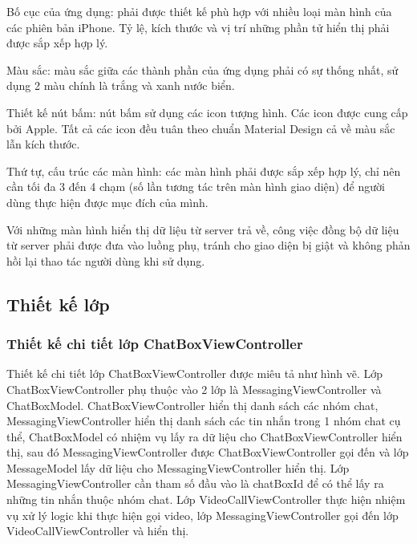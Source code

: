\documentclass[../DoAn.tex]{subfiles}
\begin{document}
Bố cục của ứng dụng: phải được thiết kế phù hợp với nhiều loại màn hình của các phiên bản iPhone. Tỷ lệ, kích thước và vị trí những phần tử hiển thị phải được sắp xếp hợp lý.

Màu sắc: màu sắc giữa các thành phần của ứng dụng phải có sự thống nhất, sử dụng 2 màu chính là trắng và xanh nước biển.

Thiết kế nút bấm: nút bấm sử dụng các icon tượng hình. Các icon được cung cấp bởi Apple. Tất cả các icon đều tuân theo chuẩn Material Design cả về màu sắc lẫn kích thước.

Thứ tự, cấu trúc các màn hình: các màn hình phải được sắp xếp hợp lý, chỉ nên cần tối đa 3 đến 4 chạm (số lần tương tác trên màn hình giao diện) để người dùng thực hiện được mục đích của mình.

Với những màn hình hiển thị dữ liệu từ server trả về, công việc đồng bộ dữ liệu từ server phải được đưa vào luồng phụ, tránh cho giao diện bị giật và không phản hồi lại thao tác người dùng khi sử dụng.



\subsection{Thiết kế lớp}
\subsubsection{Thiết kế chi tiết lớp ChatBoxViewController}
Thiết kế chi tiết lớp ChatBoxViewController được miêu tả như hình vẽ. Lớp ChatBoxViewController phụ thuộc vào 2 lớp là MessagingViewController và ChatBoxModel. ChatBoxViewController hiển thị danh sách các nhóm chat, MessagingViewController hiển thị danh sách các tin nhắn trong 1 nhóm chat cụ thể, ChatBoxModel có nhiệm vụ lấy ra dữ liệu cho ChatBoxViewController hiển thị, sau đó MessagingViewController được ChatBoxViewController gọi đến và lớp MessageModel lấy dữ liệu cho MessagingViewController hiển thị. Lớp MessagingViewController cần tham số đầu vào là chatBoxId để có thể lấy ra những tin nhắn thuộc nhóm chat.
Lớp VideoCallViewController thực hiện nhiệm vụ xử lý logic khi thực hiện gọi video, lớp MessagingViewController gọi đến lớp VideoCallViewController và hiển thị.
\end{document}
